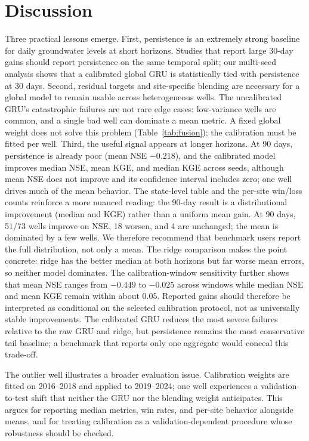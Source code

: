 \documentclass[preprint,12pt]{elsarticle}
\begin{document}
\section{Discussion}

Three practical lessons emerge. First, persistence is an extremely strong
baseline for daily groundwater levels at short horizons. Studies that report
large 30-day gains should report persistence on the same temporal split; our
multi-seed analysis shows that a calibrated global GRU is statistically tied
with persistence at 30 days. Second, residual targets and site-specific blending
are necessary for a global model to remain usable across heterogeneous wells.
The uncalibrated GRU's catastrophic failures are not rare edge cases:
low-variance wells are common, and a single bad well can dominate a mean
metric. A fixed global weight does not solve this problem (Table~\ref{tab:fusion});
the calibration must be fitted per well. Third, the
useful signal appears at longer horizons. At 90 days, persistence is already
poor (mean NSE $-0.218$), and the calibrated model improves median NSE, mean
KGE, and median KGE across seeds, although mean NSE does not improve and its
confidence interval includes zero; one well drives much of the mean behavior.
The state-level table and the per-site win/loss counts reinforce a more nuanced
reading: the 90-day result is a distributional improvement (median and KGE)
rather than a uniform mean gain. At 90 days, 51/73 wells improve on NSE, 18
worsen, and 4 are unchanged; the mean is dominated by a few wells. We therefore
recommend that benchmark users report the full distribution, not only a mean.
The ridge comparison makes the point concrete: ridge has the better median at
both horizons but far worse mean errors, so neither model dominates. The
calibration-window sensitivity further shows that mean NSE ranges from $-0.449$
to $-0.025$ across windows while median NSE and mean KGE remain within about
0.05. Reported gains should therefore be interpreted as conditional on the
selected calibration protocol, not as universally stable improvements. The
calibrated GRU reduces the most severe failures relative to the raw GRU and
ridge, but persistence remains the most conservative tail baseline; a benchmark
that reports only one aggregate would conceal this trade-off.

The outlier well illustrates a broader evaluation issue. Calibration weights
are fitted on 2016--2018 and applied to 2019--2024; one well experiences a
validation-to-test shift that neither the GRU nor the blending weight
anticipates. This argues for reporting median metrics, win rates, and
per-site behavior alongside means, and for treating calibration as a
validation-dependent procedure whose robustness should be checked.
\end{document}
